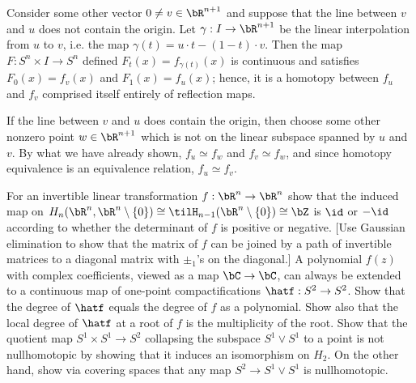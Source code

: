 \begin{homework}[e]
\begin{prf}
    Consider some other vector $0 \neq v \in \bR^{n+1}$ and suppose that the line between $v$ and $u$ does not contain the origin. Let $\gamma:I \to \bR^{n+1}$ be the linear interpolation from $u$ to $v$, i.e. the map $\gamma(t) = u\cdot t - (1 - t)\cdot v$. Then the map $F:S^n\times I \to S^n$ defined $F_t(x) = f_{\gamma(t)}(x)$ is continuous and satisfies $F_0(x) = f_v(x)$ and $F_1(x) = f_u(x)$; hence, it is a homotopy between $f_u$ and $f_v$ comprised itself entirely of reflection maps.

    If the line between $v$ and $u$ does contain the origin, then choose some other nonzero point $w \in \bR^{n+1}$ which is not on the linear subspace spanned by $u$ and $v$. By what we have already shown, $f_u \simeq f_w$ and $f_v \simeq f_w$, and since homotopy equivalence is an equivalence relation, $f_u \simeq f_v$.
  \end{prf}
   For an invertible linear transformation $f:\bR^n\to \bR^n$ show that the induced map on $H_n (\bR^n, \bR^n \setminus \{0\}) \cong \tilH_{n-1}(\bR^n \setminus \{0\}) \cong \bZ$ is $\id$ or $-\id$ according to whether the determinant of $f$ is positive or negative. [Use Gaussian elimination to show that the matrix of $f$ can be joined by a path of invertible matrices to a diagonal matrix with $\pm_1$'s on the diagonal.]
   A polynomial $f(z)$ with complex coefficients, viewed as a map $\bC\to \bC$, can always be extended to a continuous map of one-point compactifications $\hatf:S^2 \to S^2$. Show that the degree of $\hatf$ equals the degree of $f$ as a  polynomial. Show also that the local degree of $\hatf$ at a root of $f$ is the multiplicity of the root.
   Show that the quotient map $S^1\times S^1 \to S^2$ collapsing the subspace $S^1 \vee S^1$ to a point is not nullhomotopic by showing that it induces an isomorphism on $H_2$. On the other hand, show via covering spaces that any map $S^2 \to S^1\vee S^1$ is nullhomotopic.
\end{homework}
\begin{homework}[e]
\end{homework}

